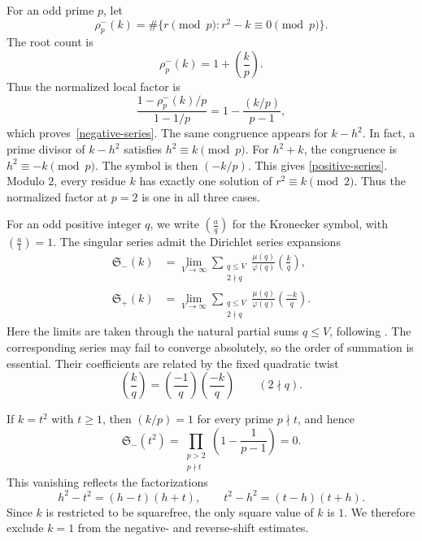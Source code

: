 \documentclass[12pt,reqno]{amsart}
\numberwithin{equation}{section}
\theoremstyle{plain}
\theoremstyle{remark}
\begin{document}
For an odd prime $p$, let
\[
 \rho_p^-(k)=\#\{r\pmod p:r^2-k\equiv0\pmod p\}.
\]
The root count is
\begin{equation*}\label{root-count-minus}
 \rho_p^-(k)=1+\left(\frac{k}{p}\right).
\end{equation*}
Thus the normalized local factor is
\begin{equation*}\label{local-factor-minus}
 \frac{1-\rho_p^-(k)/p}{1-1/p}
 =1-\frac{(k/p)}{p-1},
\end{equation*}
which proves~\eqref{negative-series}.  The same congruence appears for
$k-h^2$.  In fact, a prime divisor of $k-h^2$ satisfies
$h^2\equiv k\pmod p$.  For $h^2+k$, the congruence is
$h^2\equiv-k\pmod p$.  The symbol is then $(-k/p)$.  This gives
\eqref{positive-series}.  Modulo $2$, every residue $k$ has exactly one
solution of $r^2\equiv k\pmod2$.  Thus the normalized factor at $p=2$
is one in all three cases.

For an odd positive integer $q$, we write
$\left(\frac{a}{q}\right)$ for the Kronecker symbol,
with $\left(\frac{a}{1}\right)=1$. The singular series admit the Dirichlet series expansions
\begin{align}
 \mathfrak S_-(k)
 &=\lim_{V\to\infty}
   \sum_{\substack{q\leq V\\2\nmid q}}
   \frac{\mu(q)}{\varphi(q)}
   \left(\frac{k}{q}\right),
 \label{negative-series-expansion}\\
 \mathfrak S_+(k)
 &=\lim_{V\to\infty}
   \sum_{\substack{q\leq V\\2\nmid q}}
   \frac{\mu(q)}{\varphi(q)}
   \left(\frac{-k}{q}\right).
 \label{positive-series-expansion}
\end{align}
Here the limits are taken through the natural partial sums $q\leq V$,
following \cite[Section~4]{BaierZhao2007}.  The corresponding series
may fail to converge absolutely, so the order of summation is essential.
Their coefficients are related by the fixed
quadratic twist
\begin{equation*}\label{fixed-twist}
 \left(\frac{k}{q}\right)
 =
 \left(\frac{-1}{q}\right)
 \left(\frac{-k}{q}\right)
 \qquad (2\nmid q).
\end{equation*}

If $k=t^2$ with $t\geq1$, then $(k/p)=1$ for every prime $p\nmid t$,
and hence
\[
 \mathfrak S_-(t^2)
 =
 \prod_{\substack{p>2\\p\nmid t}}
 \left(1-\frac{1}{p-1}\right)
 =0.
\]
This vanishing reflects the factorizations
\[
 h^2-t^2=(h-t)(h+t),
 \qquad
 t^2-h^2=(t-h)(t+h).
\]
Since $k$ is restricted to be squarefree, the only square value of $k$
is $1$.  We therefore exclude $k=1$ from the negative- and
reverse-shift estimates.
\end{document}
